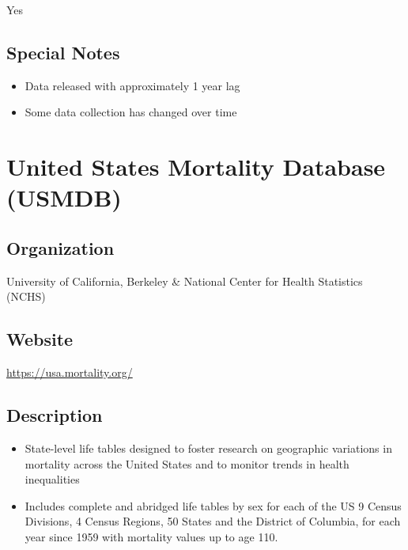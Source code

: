 \documentclass[
]{book}
\providecommand{\tightlist}{%
  \setlength{\itemsep}{0pt}\setlength{\parskip}{0pt}}
\begin{document}
Yes

\hypertarget{special-notes-90}{%
\section{Special Notes}\label{special-notes-90}}

\begin{itemize}
\tightlist
\item
  Data released with approximately 1 year lag
\item
  Some data collection has changed over time
\end{itemize}

\mainmatter

\hypertarget{united-states-mortality-database-usmdb}{%
\chapter{United States Mortality Database (USMDB)}\label{united-states-mortality-database-usmdb}}

\hypertarget{organization-91}{%
\section{Organization}\label{organization-91}}

University of California, Berkeley \& National Center for Health Statistics (NCHS)

\hypertarget{website-91}{%
\section{Website}\label{website-91}}

\url{https://usa.mortality.org/}

\hypertarget{description-91}{%
\section{Description}\label{description-91}}

\begin{itemize}
\tightlist
\item
  State-level life tables designed to foster research on geographic variations in mortality across the United States and to monitor trends in health inequalities
\item
  Includes complete and abridged life tables by sex for each of the US 9 Census Divisions, 4 Census Regions, 50 States and the District of Columbia, for each year since 1959 with mortality values up to age 110.
\end{itemize}
\end{document}
